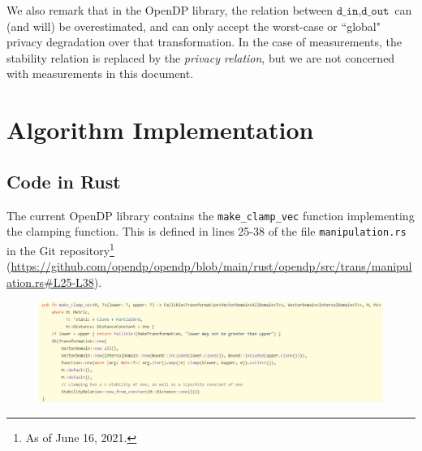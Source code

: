\documentclass[11pt,a4paper]{article}
\theoremstyle{definition}
\newcommand{\din}{\texttt{d\_in}}
\newcommand{\dout}{\texttt{d\_out}}
\newcommand{\mike}[1]{{ {\color{green}{(mike)~#1}}}}
\begin{document}
We also remark that in the OpenDP library, the relation between $\din, \dout$ can (and will) be overestimated, and can only accept the worst-case or ``global" privacy degradation over that transformation. In the case of measurements, the stability relation is replaced by the \textit{privacy relation}, but we are not concerned with measurements in this document.

\section{Algorithm Implementation}


\subsection{Code in Rust}
The current OpenDP library contains the \texttt{make\_clamp\_vec} function implementing the clamping function. This is defined in lines 25-38 of the file \texttt{manipulation.rs} in the Git repository\footnote{As of June 16, 2021.} (\url{https://github.com/opendp/opendp/blob/main/rust/opendp/src/trans/manipulation.rs#L25-L38}).
\mike{This is pretty dated now. Would be good to get an updated version with the AbsoluteDistance clamping. I'm happy to explain how this works.}

\begin{figure}[ht]
    \includegraphics[width=16cm]{clamp_rust.png}
    \centering
    \label{fig:code}
\end{figure}
\end{document}
